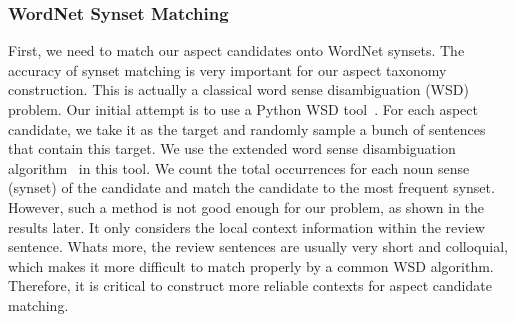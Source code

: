 \subsubsection{WordNet Synset Matching}
\label{sec:match}
First, we need to match our aspect candidates onto WordNet synsets.
The accuracy of synset matching is very important for our 
aspect taxonomy construction.
This is actually a classical word sense disambiguation (WSD) problem.
Our initial attempt is to use a Python WSD tool~\cite{pywsd14}.
For each aspect candidate, we take it as the target and 
randomly sample a bunch of sentences that contain this target. 
We use the extended word sense disambiguation algorithm~\cite{banerjee2003extended} 
in this tool. We count the total occurrences for each noun 
sense (synset) of the candidate and match the candidate to the most frequent
synset.  However, such a method is not good enough for our problem,
as shown in the results later.
It only considers the local context information within the review sentence. 
Whats more, the review sentences are usually very 
short and colloquial, which makes it 
more difficult to match properly by a common WSD algorithm.
Therefore, it is critical to construct more reliable contexts for 
aspect candidate matching. 

